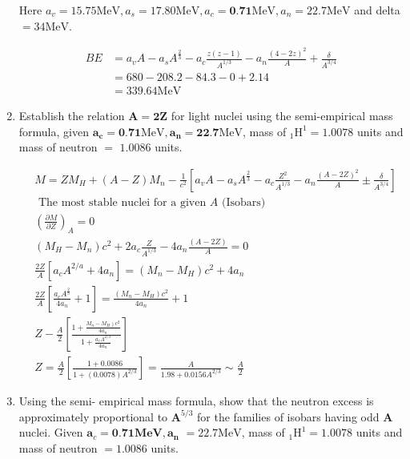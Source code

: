 \begin{enumerate}
Here $a_v=15.75 \mathrm{MeV}, a_s=17.80 \mathrm{MeV}, a_c=\mathbf{0 . 7 1} \mathrm{MeV}, a_n=22.7 \mathrm{MeV}$ and delta $=34 \mathrm{MeV}$.
\begin{answer}
	\begin{align*}
	B E&=a_v A-a_s A^{\frac{2}{3}}-a_{c} \frac{z(z-1)}{A^{1/3}}-a_n \frac{(4-2 z)^2}{A}+\frac{\delta}{A^{3 / 4}}\\
	&=680-208.2-84.3-0+2.14 \\
	&=339.64 \mathrm{MeV}
	\end{align*}
\end{answer}
\item  Establish the relation $\mathbf{A}=\mathbf{2} \mathbf{Z}$ for light nuclei using the semi-empirical mass formula, given $\boldsymbol{a}_{\boldsymbol{c}}=\mathbf{0 . 7 1} \mathrm{MeV}, \boldsymbol{a}_{\boldsymbol{n}}=\mathbf{2 2 . 7} \mathrm{MeV}$, mass of ${ }_1 \mathrm{H}^1=1.0078$ units and mass of neutron $=$ $1.0086$ units.
\begin{answer}
	\begin{align*}
	&M=Z M_H+(A-Z) M_n-\frac{1}{c^2}\left[a_v A-a_s A^{\frac{2}{3}}-a_{c} \frac{Z^2}{A^{1/3}}-a_n \frac{(A-2 Z)^2}{A} \pm \frac{\delta}{A^{3/4}}\right]\\
&\text{	The most stable nuclei for a given $A$ (Isobars)}\\
	&\left(\frac{\partial M}{\partial Z}\right)_A=0\\
	&\left(M_H-M_n\right) c^2+2 a_{c} \frac{Z}{A^{1/3}}-4 a_n \frac{\left(A-2 Z\right)}{A}=0\\
	&\frac{2 Z}{A}\left[a_{c} A^{2/a}+4 a_n\right]=\left(M_n-M_H\right) c^2+4 a_n\\
	&\frac{2 Z}{A}\left[\frac{a_c A^{\frac{2}{3}}}{4 a_n}+1\right]=\frac{\left(M_n-M_H\right) c^2}{4 a_n}+1\\
	&Z-\frac{A}{2}\left[\frac{1+\frac{\left.M_n-M_H\right) c^2}{4 a_n}}{1+\frac{a_cA^{2/3}}{4 a_n}}\right]\\
	&Z=\frac{A}{2}\left[\frac{1+0.0086}{1+(0.0078) A^{2 / 3}}\right]=\frac{A}{1.98+0.0156 A^{2 / 3}} \sim \frac{A}{2}
	\end{align*}
\end{answer}
\item  Using the semi- empirical mass formula, show that the neutron excess is approximately proportional to $\mathbf{A}^{5 / 3}$ for the families of isobars having odd $\mathbf{A}$ nuclei. Given $\boldsymbol{a}_c=\mathbf{0 . 7 1} \mathbf{M e V}, \boldsymbol{a}_{\boldsymbol{n}}$ $=22.7 \mathrm{MeV}$, mass of ${ }_1 \mathrm{H}^1=1.0078$ units and mass of neutron $=1.0086$ units.

\end{enumerate}

